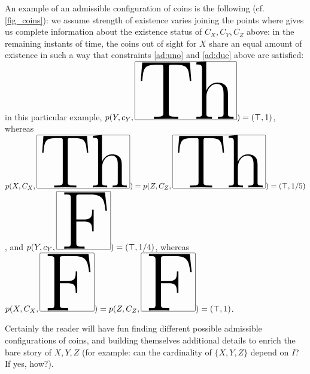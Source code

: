 \begin{example}
  An example of an admissible configuration of coins is the following (cf. \autoref{fig_coins}): we assume strength of existence varies joining the points where \cite{Borges1963} gives us complete information about the existence status of $C_X,C_Y,C_Z$ above: in the remaining instants of time, the coins out of sight for $X$ share an equal amount of existence in such a way that constraints \ref{ad:uno} and \ref{ad:due} above are satisfied: in this particular example, $p(Y,c_Y,\Th) = (\top,1)$, whereas $p(X,C_X,\Th)=p(Z,C_Z,\Th)=(\top,1/5)$, and $p(Y,c_Y,\F)=(\top,1/4)$, whereas $p(X,C_X,\F)=p(Z,C_Z,\F)=(\top,1)$.

  Certainly the reader will have fun finding different possible admissible configurations of coins, and building themselves additional details to enrich the bare story of $X,Y,Z$ (for example: can the cardinality of $\{X,Y,Z\}$ depend on $I$? If yes, how?).
\end{example}
